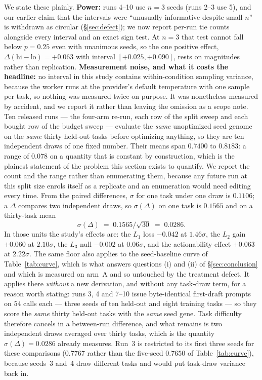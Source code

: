 \documentclass[11pt]{article}
\newcommand{\dd}{\ensuremath{\Delta}}
\begin{document}
We state these plainly. \textbf{Power:} runs 4--10 use $n{=}3$ seeds (runs 2--3 use 5), and
our earlier claim that the intervals were ``unusually informative despite small $n$'' is
withdrawn as circular (\S\ref{sec:defect}); we now report per-run tie counts alongside every
interval and an exact sign test. At $n{=}3$ that test cannot fall below $p=0.25$ even with
unanimous seeds, so the one positive effect, $\dd(\text{hi}-\text{lo})=+0.063$ with interval
$[+0.025,+0.090]$, rests on magnitudes rather than replication. \textbf{Measurement noise, and
what it costs the headline:} no interval in this study contains within-condition sampling
variance, because the worker runs at the provider's default temperature with one sample per
task, so nothing was measured twice on purpose. It was nonetheless measured by accident, and we
report it rather than leaving the omission as a scope note. Ten released runs --- the four-arm
re-run, each row of the split sweep and each bought row of the budget sweep --- evaluate the
\emph{same} unoptimized seed genome on the \emph{same} thirty held-out tasks before optimizing
anything, so they are ten independent draws of one fixed number. Their means span $0.7400$ to
$0.8183$: a range of $0.078$ on a quantity that is constant by construction, which is the
plainest statement of the problem this section exists to quantify. We report the count and the
range rather than enumerating them, because any future run at this split size enrols itself as a
replicate and an enumeration would need editing every time.
From the paired differences, $\sigma$ for one task under one draw is $0.1106$; a $\dd$ compares
two independent draws, so $\sigma(\dd)$ on one task is $0.1565$ and on a thirty-task mean
\[
\sigma(\dd) \;=\; 0.1565/\sqrt{30} \;=\; 0.0286 .
\]
In those units the study's effects are: the $L_1$ loss $-0.042$ at $1.46\sigma$, the $L_2$ gain
$+0.060$ at $2.10\sigma$, the $L_3$ null $-0.002$ at $0.06\sigma$, and the actionability effect
$+0.063$ at $2.22\sigma$. The same floor also applies to the seed-baseline curve of Table~\ref{tab:curve}, which is what
answers questions (i) and (ii) of \S\ref{sec:conclusion} and which is measured on arm~A and so
untouched by the treatment defect. It applies there \emph{without} a new derivation, and without
any task-draw term, for a reason worth stating: runs 3, 4 and 7--10 issue byte-identical
first-draft prompts on $54$ calls each --- three seeds of ten held-out and eight training tasks
--- so they score the \emph{same} thirty held-out tasks with the \emph{same} seed gene. Task
difficulty therefore cancels in a between-run difference, and what remains is two independent
draws averaged over thirty tasks, which is the quantity $\sigma(\dd) = 0.0286$ already measures.
Run~3 is restricted to its first three seeds for these comparisons ($0.7767$ rather than the
five-seed $0.7650$ of Table~\ref{tab:curve}), because seeds~3 and~4 draw different tasks and
would put task-draw variance back in.
\end{document}
